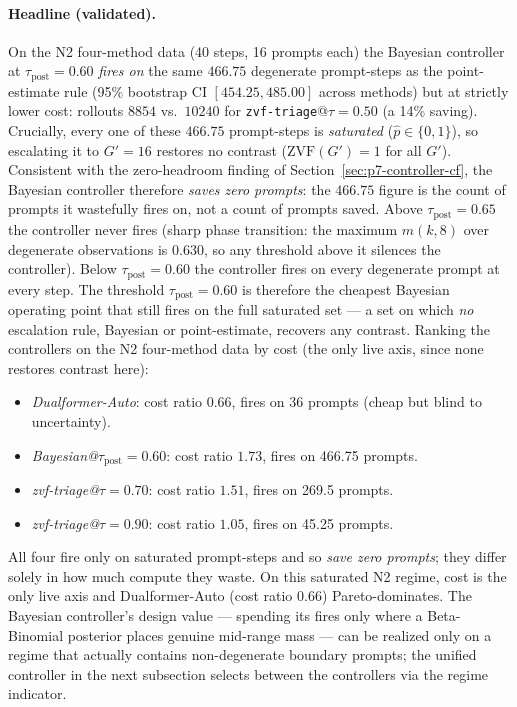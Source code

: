 \paragraph{Headline (validated).}
On the N2 four-method data (40 steps, 16 prompts each) the
Bayesian controller at $\tau_{\mathrm{post}}{=}0.60$ \emph{fires on}
the same $466.75$ degenerate prompt-steps as the point-estimate
rule (95\% bootstrap CI $[454.25, 485.00]$ across methods) but at
strictly lower cost: rollouts $8854$ vs.\ $10240$ for
\texttt{zvf-triage}@$\tau{=}0.50$ (a 14\% saving). Crucially, every
one of these $466.75$ prompt-steps is \emph{saturated}
($\hat p \in \{0,1\}$), so escalating it to $G'{=}16$ restores no
contrast ($\mathrm{ZVF}(G')=1$ for all $G'$). Consistent with the
zero-headroom finding of Section~\ref{sec:p7-controller-cf}, the
Bayesian controller therefore \emph{saves zero prompts}: the
$466.75$ figure is the count of prompts it wastefully fires on, not
a count of prompts saved. Above $\tau_{\mathrm{post}}{=}0.65$ the
controller never fires (sharp phase transition: the maximum $m(k,8)$
over degenerate observations is $0.630$, so any threshold above it
silences the controller). Below $\tau_{\mathrm{post}}{=}0.60$ the
controller fires on every degenerate prompt at every step. The
threshold $\tau_{\mathrm{post}}{=}0.60$ is therefore the cheapest
Bayesian operating point that still fires on the full saturated set
--- a set on which \emph{no} escalation rule, Bayesian or
point-estimate, recovers any contrast. Ranking the controllers on
the N2 four-method data by cost (the only live axis, since none
restores contrast here):
\begin{itemize}
\item \emph{Dualformer-Auto}: cost ratio $0.66$, fires on 36 prompts (cheap but blind to uncertainty).
\item \emph{Bayesian@$\tau_{\mathrm{post}}{=}0.60$}: cost ratio $1.73$, fires on 466.75 prompts.
\item \emph{zvf-triage@$\tau{=}0.70$}: cost ratio $1.51$, fires on 269.5 prompts.
\item \emph{zvf-triage@$\tau{=}0.90$}: cost ratio $1.05$, fires on 45.25 prompts.
\end{itemize}
All four fire only on saturated prompt-steps and so \emph{save zero
prompts}; they differ solely in how much compute they waste. On this
saturated N2 regime, cost is the only live axis and Dualformer-Auto
(cost ratio $0.66$) Pareto-dominates. The Bayesian controller's
design value --- spending its fires only where a Beta-Binomial
posterior places genuine mid-range mass --- can be realized only on
a regime that actually contains non-degenerate boundary prompts; the
unified controller in the next subsection selects between the
controllers via the regime indicator.

